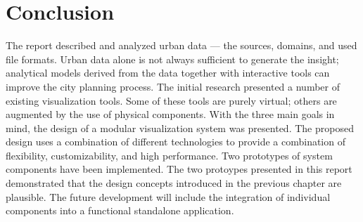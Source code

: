\chapter{Conclusion}
The report described and analyzed urban data --- the sources, domains, and used file formats. Urban data alone is not always sufficient to generate the insight; analytical models derived from the data together with interactive tools can improve the city planning process. The initial research presented a number of existing visualization tools. Some of these tools are purely virtual; others are augmented by the use of physical components.
With the three main goals in mind, the design of a modular visualization system was presented. The proposed design uses a combination of different technologies to provide a combination of flexibility, customizability, and high performance. Two prototypes of system components have been implemented. The two protoypes presented in this report demonstrated that the design concepts introduced in the previous chapter are plausible. The future development will include the integration of individual components into a functional standalone application. 
